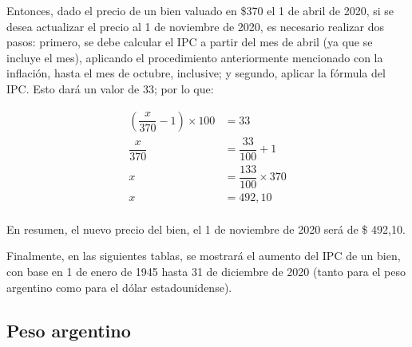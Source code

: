 \documentclass[12pt,a4paper,twoside]{book}
\begin{document}
Entonces, dado el precio de un bien valuado en \$370 el 1 de abril de 2020, si se desea actualizar el precio al 1 de noviembre de 2020, es necesario realizar dos pasos: primero, se debe calcular el IPC a partir del mes de abril (ya que se incluye el mes), aplicando el procedimiento anteriormente mencionado con la inflación, hasta el mes de octubre, inclusive; y segundo, aplicar la fórmula del IPC. Esto dará un valor de 33; por lo que:

\begin{align*}
\left( \dfrac{x}{370} - 1 \right) \times 100 &= 33 \\
\dfrac{x}{370} &= \dfrac{33}{100} +1 \\
x &= \dfrac{133}{100} \times 370 \\
x &= 492,10 \\
\end{align*}

En resumen, el nuevo precio del bien, el 1 de noviembre de 2020 será de \$ 492,10.

Finalmente, en las siguientes tablas, se mostrará el aumento del IPC de un bien, con base en 1 de enero de 1945 hasta 31 de diciembre de 2020 (tanto para el peso argentino como para el dólar estadounidense).
\newpage

\subsection{Peso argentino}


\newpage
\end{document}
